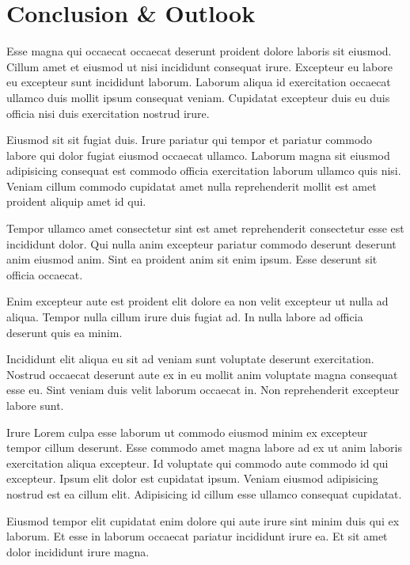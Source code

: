 
\chapter{Conclusion \& Outlook}
\label{ch:conclusion}


Esse magna qui occaecat occaecat deserunt proident dolore laboris sit eiusmod. 
Cillum amet et eiusmod ut nisi incididunt consequat irure. Excepteur eu labore 
eu excepteur sunt incididunt laborum. Laborum aliqua id exercitation occaecat
 ullamco duis mollit ipsum consequat veniam. Cupidatat excepteur duis eu duis
  officia nisi duis exercitation nostrud irure.

Eiusmod sit sit fugiat duis. Irure pariatur qui tempor et pariatur commodo
labore qui dolor fugiat eiusmod occaecat ullamco. Laborum magna sit eiusmod 
adipisicing consequat est commodo officia exercitation laborum ullamco quis
nisi. Veniam cillum commodo cupidatat amet nulla reprehenderit mollit est amet
proident aliquip amet id qui.

Tempor ullamco amet consectetur sint est amet reprehenderit consectetur esse est
incididunt dolor. Qui nulla anim excepteur pariatur commodo deserunt deserunt
anim eiusmod anim. Sint ea proident anim sit enim ipsum. Esse deserunt sit
officia occaecat.

Enim excepteur aute est proident elit dolore ea non velit excepteur ut nulla ad
aliqua. Tempor nulla cillum irure duis fugiat ad. In nulla labore ad officia
deserunt quis ea minim.

Incididunt elit aliqua eu sit ad veniam sunt voluptate deserunt exercitation.
Nostrud occaecat deserunt aute ex in eu mollit anim voluptate magna consequat
esse eu. Sint veniam duis velit laborum occaecat in. Non reprehenderit
excepteur labore sunt.

Irure Lorem culpa esse laborum ut commodo eiusmod minim ex excepteur tempor
cillum deserunt. Esse commodo amet magna labore ad ex ut anim laboris
exercitation aliqua excepteur. Id voluptate qui commodo aute commodo id qui
excepteur. Ipsum elit dolor est cupidatat ipsum. Veniam eiusmod adipisicing
nostrud est ea cillum elit. Adipisicing id cillum esse ullamco consequat cupidatat.

Eiusmod tempor elit cupidatat enim dolore qui aute irure sint minim duis qui
ex laborum. Et esse in laborum occaecat pariatur incididunt irure ea.
Et sit amet dolor incididunt irure magna.
